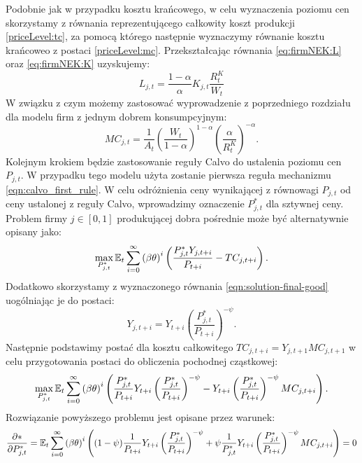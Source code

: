 Podobnie jak w przypadku kosztu krańcowego, w celu wyznaczenia poziomu cen skorzystamy z równania reprezentującego całkowity koszt produkcji \eqref{priceLevel:tc}, za pomocą którego następnie wyznaczymy równanie kosztu krańcoweo z postaci \eqref{priceLevel:mc}. Przekształcając równania \eqref{eq:firmNEK:L} oraz \eqref{eq:firmNEK:K} uzyskujemy:
\begin{equation}
    L_{j,t} = \frac{1-\alpha}{\alpha}K_{j,t} \frac{R^K_t}{W_t}
\end{equation}
W związku z czym możemy zastosować wyprowadzenie z poprzedniego rozdziału dla modelu firm z jednym dobrem konsumpcyjnym:
\begin{equation}
    MC_{j,t} = \frac{1}{A_t} \left( \frac{W_t}{1-\alpha} \right)^{1-\alpha} \left( \frac{\alpha}{R^K_t} \right)^{-\alpha}.
\end{equation}
Kolejnym krokiem będzie zastosowanie reguły Calvo do ustalenia poziomu cen $P_{j,t}$. W przypadku tego modelu użyta zostanie pierwsza reguła mechanizmu \eqref{eqn:calvo_first_rule}. W celu odróżnienia ceny wynikającej z równowagi $P_{j,t}$ od ceny ustalonej z reguły Calvo, wprowadzimy oznaczenie $P^*_{j,t}$ dla sztywnej ceny. Problem firmy $j \in [0,1]$ produkującej dobra pośrednie może być alternatywnie opisany jako:
\begin{equation}
    \max_{P^*_{j,t}}\mathbb{E}_t \sum_{i=0}^{\infty}\left( \beta \theta \right)^i\left( \frac{P^*_{j,t}Y_{j,t+i}}{P_{t+i}} - TC_{j,t+i}\right).
\end{equation}
Dodatkowo skorzystamy z wyznaczonego równania \eqref{eqn:solution-final-good} uogólniając je do postaci:
\begin{equation}
    \label{eqn:solution-final-good-general}
    Y_{j,t+i} = Y_{t+i} \left(\frac{P^*_{j,t}}{P_{t+i}}\right)^{-\psi}.
\end{equation}
Następnie podstawimy postać dla kosztu całkowitego $TC_{j,t+i} = Y_{j,t+1} MC_{j,t+1}$ w celu przygotowania postaci do obliczenia pochodnej cząstkowej:
\begin{equation}
    \max_{P^*_{j,t}}\mathbb{E}_t \sum_{i=0}^{\infty}\left( \beta \theta \right)^i\left( \frac{P^*_{j,t}}{P_{t+i}}Y_{t+i}\left(\frac{P^*_{j,t}}{P_{t+i}}\right)^{-\psi} - Y_{t+i}\left(\frac{P^*_{j,t}}{P_{t+i}}\right)^{-\psi} MC_{j,t+i}\right).
\end{equation}
Rozwiązanie powyższego problemu jest opisane przez warunek:
\begin{equation}
    \frac{\partial *}{\partial P^*_{j,t}} = \mathbb{E}_t \sum_{i=0}^{\infty}\left( \beta \theta \right)^i\left( (1-\psi)\frac{1}{P_{t+i}}Y_{t+i}\left(\frac{P^*_{j,t}}{P_{t+i}}\right)^{-\psi} + \psi \frac{1}{P^*_{j,t}} Y_{t+i} \left(\frac{P^*_{j,t}}{P_{t+i}}\right)^{-\psi} MC_{j,t+i}\right) = 0
\end{equation}
